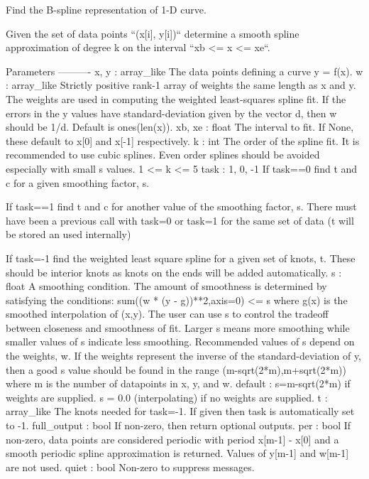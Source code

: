 \begin{DoxyVerb}Find the B-spline representation of 1-D curve.

Given the set of data points ``(x[i], y[i])`` determine a smooth spline
approximation of degree k on the interval ``xb <= x <= xe``.

Parameters
----------
x, y : array_like
    The data points defining a curve y = f(x).
w : array_like
    Strictly positive rank-1 array of weights the same length as x and y.
    The weights are used in computing the weighted least-squares spline
    fit. If the errors in the y values have standard-deviation given by the
    vector d, then w should be 1/d. Default is ones(len(x)).
xb, xe : float
    The interval to fit.  If None, these default to x[0] and x[-1]
    respectively.
k : int
    The order of the spline fit. It is recommended to use cubic splines.
    Even order splines should be avoided especially with small s values.
    1 <= k <= 5
task : {1, 0, -1}
    If task==0 find t and c for a given smoothing factor, s.

    If task==1 find t and c for another value of the smoothing factor, s.
    There must have been a previous call with task=0 or task=1 for the same
    set of data (t will be stored an used internally)

    If task=-1 find the weighted least square spline for a given set of
    knots, t. These should be interior knots as knots on the ends will be
    added automatically.
s : float
    A smoothing condition. The amount of smoothness is determined by
    satisfying the conditions: sum((w * (y - g))**2,axis=0) <= s where g(x)
    is the smoothed interpolation of (x,y). The user can use s to control
    the tradeoff between closeness and smoothness of fit. Larger s means
    more smoothing while smaller values of s indicate less smoothing.
    Recommended values of s depend on the weights, w. If the weights
    represent the inverse of the standard-deviation of y, then a good s
    value should be found in the range (m-sqrt(2*m),m+sqrt(2*m)) where m is
    the number of datapoints in x, y, and w. default : s=m-sqrt(2*m) if
    weights are supplied. s = 0.0 (interpolating) if no weights are
    supplied.
t : array_like
    The knots needed for task=-1. If given then task is automatically set
    to -1.
full_output : bool
    If non-zero, then return optional outputs.
per : bool
    If non-zero, data points are considered periodic with period x[m-1] -
    x[0] and a smooth periodic spline approximation is returned. Values of
    y[m-1] and w[m-1] are not used.
quiet : bool
    Non-zero to suppress messages.


\end{DoxyVerb}
